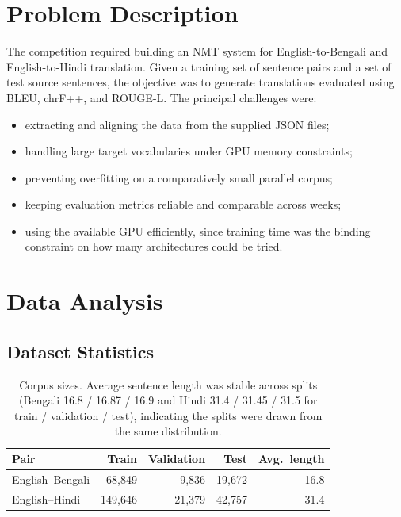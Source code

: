 \documentclass[11pt, oneside]{article}
\begin{document}
\section{Problem Description}

The competition required building an NMT system for English-to-Bengali and English-to-Hindi
translation. Given a training set of sentence pairs and a set of test source sentences, the
objective was to generate translations evaluated using BLEU, chrF++, and ROUGE-L. The
principal challenges were:

\begin{itemize}
    \item extracting and aligning the data from the supplied JSON files;
    \item handling large target vocabularies under GPU memory constraints;
    \item preventing overfitting on a comparatively small parallel corpus;
    \item keeping evaluation metrics reliable and comparable across weeks;
    \item using the available GPU efficiently, since training time was the binding constraint
          on how many architectures could be tried.
\end{itemize}

\section{Data Analysis}

\subsection{Dataset Statistics}

\begin{table}[h!]
\centering
\small
\begin{tabular}{@{}lrrrr@{}}
\toprule
Pair & Train & Validation & Test & Avg.\ length \\
\midrule
English--Bengali & 68{,}849 & 9{,}836 & 19{,}672 & 16.8 \\
English--Hindi & 149{,}646 & 21{,}379 & 42{,}757 & 31.4 \\
\bottomrule
\end{tabular}
\caption{Corpus sizes. Average sentence length was stable across splits (Bengali 16.8 / 16.87
/ 16.9 and Hindi 31.4 / 31.45 / 31.5 for train / validation / test), indicating the splits
were drawn from the same distribution.}
\end{table}
\end{document}
